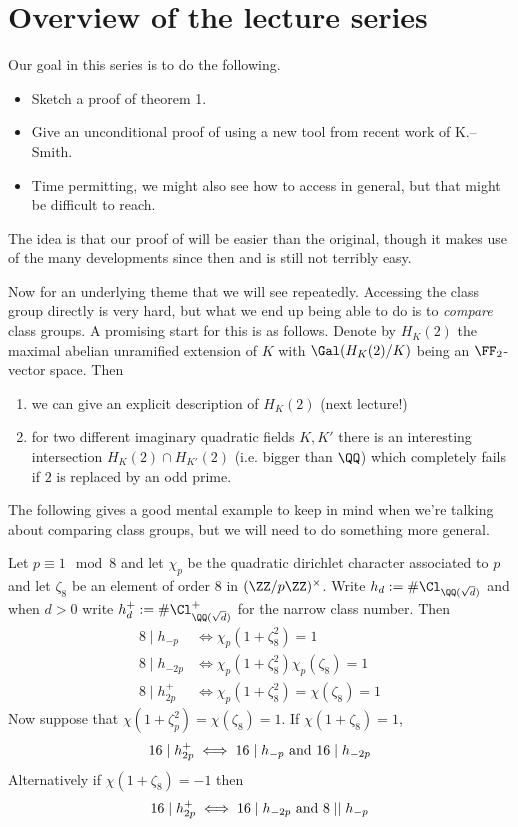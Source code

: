 \documentclass{lecturenotes}
\numberwithin{equation}{section}
\begin{document}
\section{Overview of the lecture series}
Our goal in this series is to do the following.
\begin{itemize}
    \item Sketch a proof of theorem 1.
    \item Give an unconditional proof of  using a new tool from recent work of K.--Smith.
    \item Time permitting, we might also see how to access  in general, but that might be difficult to reach.
\end{itemize}
The idea is that our proof of  will be easier than the original, though it makes use of the many developments since then and is still not terribly easy.

Now for an underlying theme that we will see repeatedly.  Accessing the class group directly is very hard, but what we end up being able to do is to \emph{compare} class groups.  A promising start for this is as follows.  Denote by $H_K(2)$ the maximal abelian unramified extension of $K$ with $\gal(H_K(2)/K)$ being an $\FF_2$-vector space.  Then
\begin{enumerate}
    \item we can give an explicit description of $H_K(2)$ (next lecture!)
    \item for two different imaginary quadratic fields $K,K'$ there is an interesting intersection $H_K(2)\cap H_{K'}(2)$ (i.e. bigger than $\QQ$) which completely fails if $2$ is replaced by an odd prime.
\end{enumerate}
The following gives a good mental example to keep in mind when we're talking about comparing class groups, but we will need to do something more general.
\begin{theorem}[Stevenhagen]
    Let $p\equiv 1\mod 8$ and let $\chi_p$ be the quadratic dirichlet character associated to $p$ and let $\zeta_8$ be an element of order $8$ in $(\ZZ/p\ZZ)^\times$.  Write $h_{d}:=\#\Cl_{\QQ(\sqrt{d})}$ and when $d>0$ write $h_{d}^+:=\#\Cl^+_{\QQ(\sqrt{d})}$ for the narrow class number.  Then
    \begin{align*}
        8\mid h_{-p}&\iff \chi_p(1+\zeta_8^2)=1\\
        8\mid h_{-2p}&\iff \chi_p(1+\zeta_8^2)\chi_p(\zeta_8)=1\\
        8\mid h_{2p}^+&\iff \chi_p(1+\zeta_8^2)=\chi(\zeta_8)=1
    \end{align*}
    Now suppose that $\chi(1+\zeta_p^2)=\chi(\zeta_8)=1$.  If $\chi(1+\zeta_8)=1$,
    \[16\mid h_{2p}^+\iff 16\mid h_{-p}\textnormal{ and }16\mid h_{-2p}\]
    Alternatively if $\chi(1+\zeta_8)=-1$ then
    \[16\mid h_{2p}^+\iff 16\mid h_{-2p}\textnormal{ and }8\mid\mid h_{-p}\]
\end{theorem}
\end{document}
